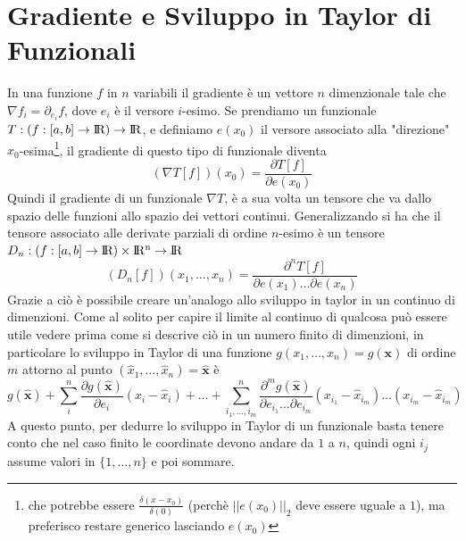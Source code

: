\documentclass[11pt,a4paper]{report}
\theoremstyle{definition}
\theoremstyle{plain}
\theoremstyle{plain}
\begin{document}
		\section{Gradiente e Sviluppo in Taylor di Funzionali}
			In una funzione $f$ in $n$ variabili il gradiente è un vettore $n$ dimenzionale tale che $\nabla f_i=\partial_{e_i} f$, dove $e_i$ è il versore $i$-esimo.\newline
			Se prendiamo un funzionale $T:(f:[a,b]\rightarrow \rm I\!R)\rightarrow \rm I\!R$, e definiamo $e(x_0)$ il versore associato alla "direzione" $x_0$-esima\footnote{che potrebbe essere $\frac{\delta (x-x_0)}{\delta(0)}$ (perchè $||e(x_0)||_2$ deve essere uguale a $1$), ma preferisco restare generico lasciando $e(x_0)$}, il gradiente di questo tipo di funzionale diventa
			\begin{equation}
				(\nabla T[f])(x_0)=\frac{\partial T[f]}{\partial e(x_0)}
			\end{equation}
			Quindi  il gradiente di un funzionale $\nabla T$, è a sua volta un tensore che va dallo spazio delle funzioni allo spazio dei vettori continui.\newline
			Generalizzando si ha che il tensore associato alle derivate parziali di ordine $n$-esimo è un tensore $D_n:(f:[a,b]\rightarrow \rm I\!R)\times \rm I\!R^n\rightarrow \rm I\!R$
			\begin{equation}
				(D_n[f])(x_1,\dots,x_n)=\frac{\partial^n T[f]}{\partial e(x_1)\dots\partial e(x_n)}
			\end{equation}
			Grazie a ciò è possibile creare un'analogo allo sviluppo in taylor in un continuo di dimenzioni.\newline
			Come al solito per capire il limite al continuo di qualcosa può essere utile vedere prima come si descrive ciò in un numero finito di dimenzioni, in particolare lo sviluppo in Taylor di una funzione $g(x_1,\dots,x_n)=g(\mathbf x)$ di ordine $m$ attorno al punto $(\hat x_1,\dots,\hat x_n)=\mathbf{\hat x}$ è
			\begin{equation}
				g(\mathbf{\hat x})+\sum_{i}^{n}\frac{\partial g(\mathbf{\hat x})}{\partial e_i}(x_i-\hat x_i)+\dots+
				\sum_{i_1,\dots,i_m}^{n}
				\frac{\partial^m g(\mathbf{\hat x})}
				{\partial e_{i_1}\dots\partial e_{i_m}}
				(x_{i_1}-\hat x_{i_m})\dots(x_{i_m}-\hat x_{i_m})
			\end{equation}
			A questo punto, per dedurre lo sviluppo in Taylor di un funzionale basta tenere conto che nel caso finito le coordinate devono andare da $1$ a $n$, quindi ogni $i_j$ assume valori in $\{1,\dots,n\}$ e poi sommare.\newline
\end{document}
